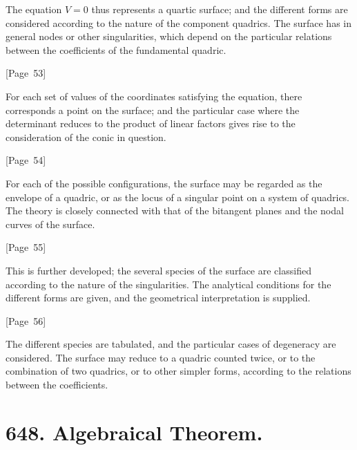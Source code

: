 \documentclass[11pt,a4paper]{book}
\begin{document}
The equation $V = 0$ thus represents a quartic surface; and the
different forms are considered according to the nature of the
component quadrics. The surface has in general nodes or other
singularities, which depend on the particular relations between the
coefficients of the fundamental quadric.

\begin{center}
[Page~53]
\end{center}

For each set of values of the coordinates satisfying the equation,
there corresponds a point on the surface; and the particular case where
the determinant reduces to the product of linear factors gives rise to
the consideration of the conic in question.

\begin{center}
[Page~54]
\end{center}

For each of the possible configurations, the surface may be regarded
as the envelope of a quadric, or as the locus of a singular point on
a system of quadrics. The theory is closely connected with that of
the bitangent planes and the nodal curves of the surface.

\begin{center}
[Page~55]
\end{center}

This is further developed; the several species of the surface are
classified according to the nature of the singularities. The
analytical conditions for the different forms are given, and the
geometrical interpretation is supplied.

\begin{center}
[Page~56]
\end{center}

The different species are tabulated, and the particular cases of
degeneracy are considered. The surface may reduce to a quadric counted
twice, or to the combination of two quadrics, or to other simpler
forms, according to the relations between the coefficients.


\newpage
\section*{648. Algebraical Theorem.}
\end{document}
